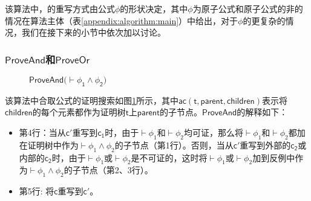 该算法中，\CPT{}的重写方式由公式$\phi$的形状决定，其中$\phi$为原子公式和原子公式的非的情况在算法主体（表\ref{appendix:algorithm:main}）中给出，对于$\phi$的更复杂的情况，我们在接下来的小节中依次加以讨论。
\subsubsection{$\mathsf{ProveAnd}$和$\mathsf{ProveOr}$}
\begin{figure}[h!]\footnotesize
	\centering
	\noindent{}
	\caption{$\mathsf{ProveAnd (\vdash\phi_1\wedge\phi_2})$}
	\label{algorithm:and}
\end{figure}
该算法中合取公式的证明搜索如图\ref{algorithm:and}所示，其中$\mathsf{ac (t, parent, children)}$表示将$\mathsf{children}$的每个元素都作为证明树$\mathsf{t}$上$\mathsf{parent}$的子节点。$\mathsf{ProveAnd}$的解释如下：

\begin{itemize}
	\item 第4行：当从$\mathsf{c'}$重写到$\mathsf{c_1}$时，由于$\vdash\phi_1$和$\vdash\phi_2$均可证，那么将$\vdash\phi_1$和$\vdash\phi_2$都加在证明树中作为$\vdash\phi_1\wedge\phi_2$的子节点（第1行）。否则，当从$\mathsf{c'}$重写到外部的$\mathsf{c_2}$或内部的$\mathsf{c_2}$时，由于$\vdash\phi_1$或$\vdash\phi_2$是不可证的，这时将$\vdash\phi_1$或$\vdash\phi_2$加到反例中作为$\vdash\phi_1\wedge\phi_2$的子节点（第2、3行）。
	\item 第5行: 将$\mathsf{c}$重写到$\mathsf{c'}$。
\end{itemize}


